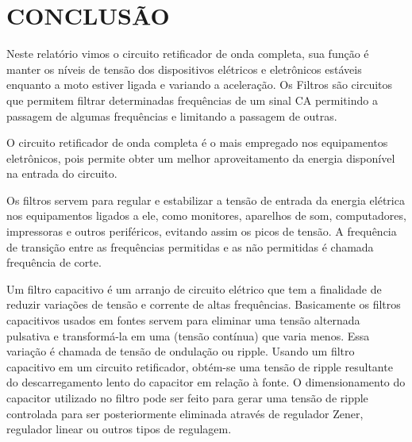 \chapter{CONCLUSÃO}

Neste relatório vimos o circuito retificador de onda completa, sua função é manter os níveis de tensão dos dispositivos elétricos e eletrônicos estáveis enquanto a moto estiver ligada e variando a aceleração. Os Filtros são circuitos que permitem filtrar determinadas frequências de um sinal CA permitindo a passagem de algumas frequências e limitando a passagem de outras. 

O circuito retificador de onda completa é o mais empregado nos equipamentos eletrônicos, pois permite obter um melhor aproveitamento da energia disponível na entrada do circuito.

Os filtros servem para regular e estabilizar a tensão de entrada da energia elétrica nos equipamentos ligados a ele, como monitores, aparelhos de som, computadores, impressoras e outros periféricos, evitando assim os picos de tensão. A frequência de transição entre as frequências permitidas e as não permitidas é chamada frequência de corte.

Um filtro capacitivo é um arranjo de circuito elétrico que tem a finalidade de reduzir variações de tensão e corrente de altas frequências. Basicamente os filtros capacitivos usados em fontes servem para eliminar uma tensão alternada pulsativa e transformá-la em uma (tensão contínua) que varia menos. Essa variação é chamada de tensão de ondulação ou ripple. Usando um filtro capacitivo em um circuito retificador, obtém-se uma tensão de ripple resultante do descarregamento lento do capacitor em relação à fonte. O dimensionamento do capacitor utilizado no filtro pode ser feito para gerar uma tensão de ripple controlada para ser posteriormente eliminada através de regulador Zener, regulador linear ou outros tipos de regulagem.